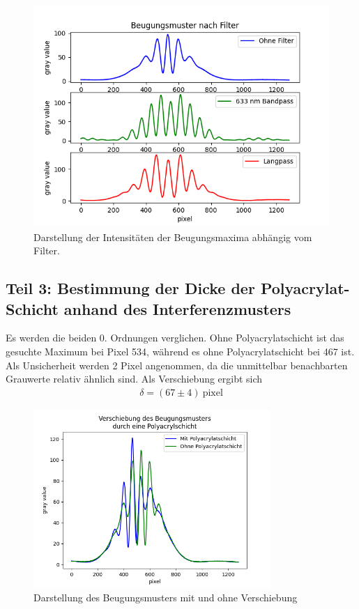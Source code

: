 \documentclass{article}
\begin{document}
\begin{figure}[H]
\centering
\caption{Darstellung der Intensitäten der Beugungsmaxima abhängig vom Filter.}
\includegraphics[width=12cm]{filter.png}
\end{figure}



\subsection{Teil 3: Bestimmung der Dicke der Polyacrylat-Schicht anhand des Interferenzmusters}

Es werden die beiden 0. Ordnungen verglichen. Ohne Polyacrylatschicht ist das gesuchte Maximum bei Pixel 534, während es ohne Polyacrylatschicht bei 467 ist. Als Unsicherheit werden 2 Pixel angenommen, da die unmittelbar benachbarten Grauwerte relativ ähnlich sind. Als Verschiebung ergibt sich
\begin{align*}
\delta = (67 \pm 4)~\text{pixel}
\end{align*}

\begin{figure}[H]
\centering
\caption{Darstellung des Beugungsmusters mit und ohne Verschiebung}
\includegraphics[width=9cm]{shift_noshift.png}
\end{figure}
\end{document}
